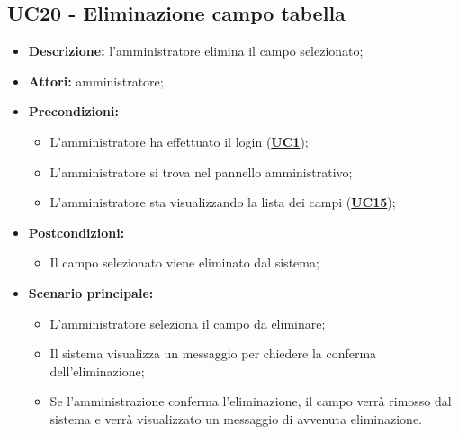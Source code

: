 \subsection{UC20 - Eliminazione campo tabella}
\label{sec:UC20}
\begin{itemize}
	\item \textbf{Descrizione:} l’amministratore elimina il campo selezionato;
	\item \textbf{Attori:} amministratore;
	\item \textbf{Precondizioni:} 
	\begin{itemize}
		\item L’amministratore ha effettuato il login (\hyperref[sec:UC1]{\textbf{UC1}});
		\item L’amministratore si trova nel pannello amministrativo;
		\item L’amministratore sta visualizzando la lista dei campi (\hyperref[sec:UC15]{\textbf{UC15}});
	\end{itemize}
	\item \textbf{Postcondizioni:} 
	\begin{itemize}
		\item Il campo selezionato viene eliminato dal sistema;
	\end{itemize}
	\item \textbf{Scenario principale:} 
	\begin{itemize}
		\item L'amministratore seleziona il campo da eliminare;
		\item Il sistema visualizza un messaggio per chiedere la conferma dell'eliminazione;
		\item Se l'amministrazione conferma l'eliminazione, il campo verrà rimosso dal sistema e verrà visualizzato un messaggio di avvenuta eliminazione.
	\end{itemize}
\end{itemize}

